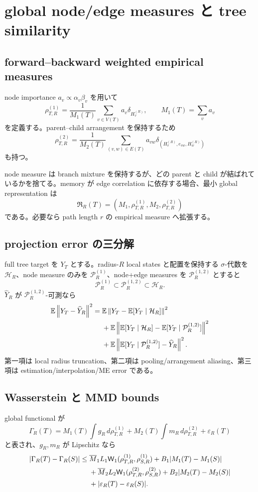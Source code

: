 \documentclass[11pt,a4paper,openany]{book}
\numberwithin{equation}{chapter}
\newcommand{\E}{\mathbb E}
\newcommand{\cH}{\mathcal H}
\newcommand{\cP}{\mathcal P}
\newcommand{\Wass}{\mathsf W_1}
\newcommand{\norm}[1]{\left\lVert #1\right\rVert}
\begin{document}
\chapter{global node/edge measures と tree similarity}
\section{forward--backward weighted empirical measures}
node importance $a_v\propto\alpha_v\beta_v$ を用いて
\[
\rho_{T,R}^{(1)}
=\frac1{M_1(T)}
\sum_{v\in V(T)}a_v\delta_{H_v^{(R)}},
\qquad
M_1(T)=\sum_va_v
\]
を定義する。parent--child arrangement を保持するため
\[
\rho_{T,R}^{(2)}
=\frac1{M_2(T)}
\sum_{(v,w)\in E(T)}a_{vw}
\delta_{(H_v^{(R)},e_{vw},H_w^{(R)})}
\]
も持つ。

node measure は branch mixture を保持するが、どの parent と child が結ばれているかを捨てる。memory が edge correlation に依存する場合、最小 global representation は
\[
\boxed{
\mathfrak R_R(T)
=(M_1,\rho_{T,R}^{(1)},M_2,\rho_{T,R}^{(2)})}
\]
である。必要なら path length $r$ の empirical measure へ拡張する。

\section{projection error の三分解}
full tree target を $Y_T$ とする。radius-$R$ local states と配置を保持する $\sigma$-代数を $\cH_R$、node measure のみを $\cP_R^{(1)}$、node+edge measures を $\cP_R^{(1,2)}$ とすると
\[
\cP_R^{(1)}\subset\cP_R^{(1,2)}\subset\cH_R.
\]
$\widehat Y_R$ が $\cP_R^{(1,2)}$-可測なら
\begin{align}
\E\norm{Y_T-\widehat Y_R}^2
={}&
\E\norm{Y_T-\E[Y_T\mid\cH_R]}^2
\notag\\
&+\E\norm{\E[Y_T\mid\cH_R]-\E[Y_T\mid\cP_R^{(1,2)}]}^2
\notag\\
&+\E\norm{\E[Y_T\mid\cP_R^{(1,2)}]-\widehat Y_R}^2.
\end{align}
第一項は local radius truncation、第二項は pooling/arrangement aliasing、第三項は estimation/interpolation/ME error である。

\section{Wasserstein と MMD bounds}
global functional が
\[
\Gamma_R(T)
=M_1(T)\int g_R\,d\rho_{T,R}^{(1)}
+M_2(T)\int m_R\,d\rho_{T,R}^{(2)}
+\varepsilon_R(T)
\]
と表され、$g_R,m_R$ が Lipschitz なら
\begin{align}
|\Gamma_R(T)-\Gamma_R(S)|
\le{}&
\overline M_1L_1\Wass(\rho_{T,R}^{(1)},\rho_{S,R}^{(1)})
+B_1|M_1(T)-M_1(S)|
\notag\\
&+\overline M_2L_2\Wass(\rho_{T,R}^{(2)},\rho_{S,R}^{(2)})
+B_2|M_2(T)-M_2(S)|
\notag\\
&+|\varepsilon_R(T)-\varepsilon_R(S)|.
\end{align}
\end{document}
